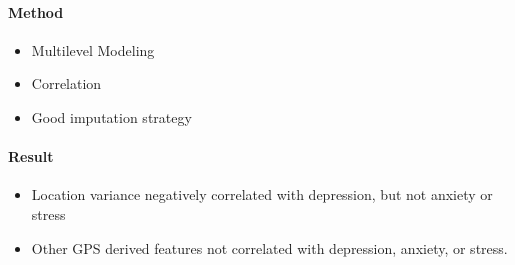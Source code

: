 \paragraph{Method}
    \begin{itemize}
        \item Multilevel Modeling 
        \item Correlation 
        \item Good imputation strategy 
    \end{itemize}
\paragraph{Result}
    \begin{itemize}
        \item Location variance negatively correlated with depression, but not anxiety or stress 
        \item Other GPS derived features not correlated with depression, anxiety, or stress. 
    \end{itemize}